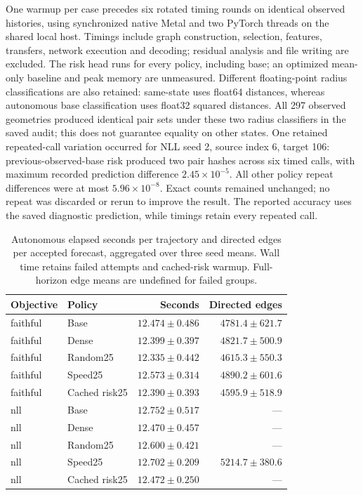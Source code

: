 One warmup per case precedes six rotated timing rounds on identical observed
histories, using synchronized native Metal and two PyTorch threads on the
shared local host. Timings include graph construction, selection, features,
transfers, network execution and decoding; residual analysis and file writing
are excluded. The risk head runs for every policy, including base; an optimized
mean-only baseline and peak memory are unmeasured. Different floating-point
radius classifications are also retained: same-state uses float64 distances,
whereas autonomous base classification uses float32 squared distances.
All 297 observed geometries produced identical pair sets under these two
radius classifiers in the saved audit; this does not guarantee equality on
other states. One retained repeated-call variation occurred for NLL seed 2,
source index 6, target 106: previous-observed-base risk produced two pair hashes
across six timed calls, with maximum recorded prediction difference
$2.45\times10^{-5}$. All other policy repeat differences were at most
$5.96\times10^{-8}$. Exact counts remained unchanged; no repeat was discarded
or rerun to improve the result. The reported accuracy uses the saved diagnostic
prediction, while timings retain every repeated call.


\begin{table}[t]
\centering\small
\caption{Autonomous elapsed seconds per trajectory and directed edges per accepted forecast, aggregated over three seed means. Wall time retains failed attempts and cached-risk warmup. Full-horizon edge means are undefined for failed groups.}
\label{tab:full-autonomous-cost}
\begin{tabular}{llrr}
\toprule
Objective & Policy & Seconds & Directed edges\\
\midrule
faithful & Base & $12.474\pm0.486$ & $4781.4\pm621.7$\\
faithful & Dense & $12.399\pm0.397$ & $4821.7\pm500.9$\\
faithful & Random25 & $12.335\pm0.442$ & $4615.3\pm550.3$\\
faithful & Speed25 & $12.573\pm0.314$ & $4890.2\pm601.6$\\
faithful & Cached risk25 & $12.390\pm0.393$ & $4595.9\pm518.9$\\
nll & Base & $12.752\pm0.517$ & ---\\
nll & Dense & $12.470\pm0.457$ & ---\\
nll & Random25 & $12.600\pm0.421$ & ---\\
nll & Speed25 & $12.702\pm0.209$ & $5214.7\pm380.6$\\
nll & Cached risk25 & $12.472\pm0.250$ & ---\\
\bottomrule
\end{tabular}
\end{table}


